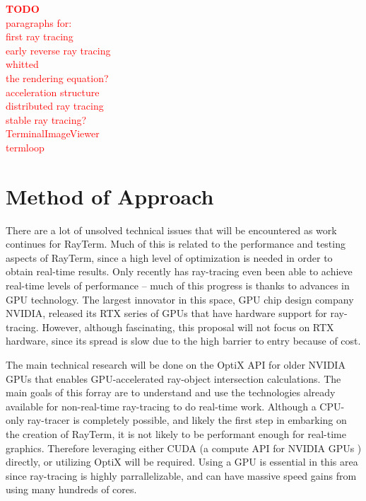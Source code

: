 \documentclass[11pt]{article}
\newcommand{\name}{{\sc RayTerm}}
\newcommand\todo[1]{
\begin{center}
  \textcolor{red}{\bf TODO}\\
  \textcolor{red}{#1}
\end{center}
}
\begin{document}
\todo{
paragraphs for:\\
first ray tracing\\
early reverse ray tracing\\
whitted\\
the rendering equation?\\
acceleration structure\\
distributed ray tracing\\
stable ray tracing?\\
TerminalImageViewer\\
termloop\\
}


\section{Method of Approach}
\label{sec:method}



There are a lot of unsolved technical issues that will be encountered as work continues for \name.
Much of this is related to the performance and testing aspects of \name, since a high level of optimization is needed in order to obtain real-time results.
Only recently has ray-tracing even been able to achieve real-time levels of performance -- much of this progress is thanks to advances in GPU technology.
The largest innovator in this space, GPU chip design company NVIDIA, released its RTX series of GPUs that have hardware support for ray-tracing.
However, although fascinating, this proposal will not focus on RTX hardware, since its spread is slow due to the high barrier to entry because of cost.

The main technical research will be done on the OptiX API \cite{parker2010optix} for older NVIDIA GPUs that enables GPU-accelerated ray-object intersection calculations.
The main goals of this forray are to understand and use the technologies already available for non-real-time ray-tracing to do real-time work.
Although a CPU-only ray-tracer is completely possible, and likely the first step in embarking on the creation of \name, it is not likely to be performant enough for real-time graphics.
Therefore leveraging either CUDA (a compute API for NVIDIA GPUs \cite{nvidia2011cuda}) directly, or utilizing OptiX will be required.
Using a GPU is essential in this area since ray-tracing is highly parrallelizable, and can have massive speed gains from using many hundreds of cores.
\end{document}
